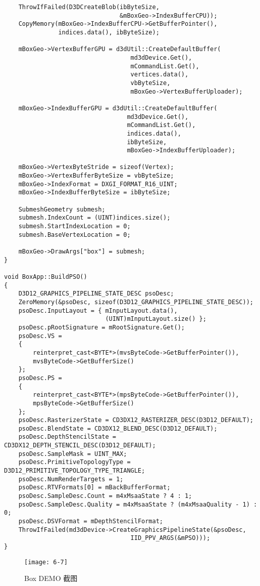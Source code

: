\begin{lstlisting}
    ThrowIfFailed(D3DCreateBlob(ibByteSize, 
                                &mBoxGeo->IndexBufferCPU));
    CopyMemory(mBoxGeo->IndexBufferCPU->GetBufferPointer(), 
               indices.data(), ibByteSize);

    mBoxGeo->VertexBufferGPU = d3dUtil::CreateDefaultBuffer(
                                   md3dDevice.Get(),
                                   mCommandList.Get(), 
                                   vertices.data(), 
                                   vbByteSize, 
                                   mBoxGeo->VertexBufferUploader);

    mBoxGeo->IndexBufferGPU = d3dUtil::CreateDefaultBuffer(
                                  md3dDevice.Get(),
                                  mCommandList.Get(),
                                  indices.data(), 
                                  ibByteSize, 
                                  mBoxGeo->IndexBufferUploader);

    mBoxGeo->VertexByteStride = sizeof(Vertex);
    mBoxGeo->VertexBufferByteSize = vbByteSize;
    mBoxGeo->IndexFormat = DXGI_FORMAT_R16_UINT;
    mBoxGeo->IndexBufferByteSize = ibByteSize;

    SubmeshGeometry submesh;
    submesh.IndexCount = (UINT)indices.size();
    submesh.StartIndexLocation = 0;
    submesh.BaseVertexLocation = 0;

    mBoxGeo->DrawArgs["box"] = submesh;
}

void BoxApp::BuildPSO()
{
    D3D12_GRAPHICS_PIPELINE_STATE_DESC psoDesc;
    ZeroMemory(&psoDesc, sizeof(D3D12_GRAPHICS_PIPELINE_STATE_DESC));
    psoDesc.InputLayout = { mInputLayout.data(), 
                            (UINT)mInputLayout.size() };
    psoDesc.pRootSignature = mRootSignature.Get();
    psoDesc.VS = 
    { 
        reinterpret_cast<BYTE*>(mvsByteCode->GetBufferPointer()), 
        mvsByteCode->GetBufferSize() 
    };
    psoDesc.PS = 
    { 
        reinterpret_cast<BYTE*>(mpsByteCode->GetBufferPointer()), 
        mpsByteCode->GetBufferSize() 
    };
    psoDesc.RasterizerState = CD3DX12_RASTERIZER_DESC(D3D12_DEFAULT);
    psoDesc.BlendState = CD3DX12_BLEND_DESC(D3D12_DEFAULT);
    psoDesc.DepthStencilState = CD3DX12_DEPTH_STENCIL_DESC(D3D12_DEFAULT);
    psoDesc.SampleMask = UINT_MAX;
    psoDesc.PrimitiveTopologyType = D3D12_PRIMITIVE_TOPOLOGY_TYPE_TRIANGLE;
    psoDesc.NumRenderTargets = 1;
    psoDesc.RTVFormats[0] = mBackBufferFormat;
    psoDesc.SampleDesc.Count = m4xMsaaState ? 4 : 1;
    psoDesc.SampleDesc.Quality = m4xMsaaState ? (m4xMsaaQuality - 1) : 0;
    psoDesc.DSVFormat = mDepthStencilFormat;
    ThrowIfFailed(md3dDevice->CreateGraphicsPipelineState(&psoDesc, 
                                   IID_PPV_ARGS(&mPSO)));
}
\end{lstlisting}
\begin{figure}[h]
	\texttt{[image: 6-7]}
	\centering
	\caption{Box DEMO 截图}
	\label{fig:6-7}
\end{figure}

